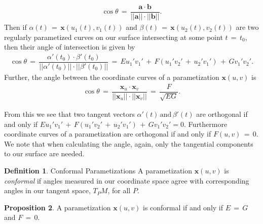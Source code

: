 \documentclass{UKZNcomp}
\newcommand{\vect}[1]{\mathbf{#1}} %
\theoremstyle{definition}
\newtheorem{definition}{Definition}[section]
\newtheorem{prop}[definition]{Proposition}
\theoremstyle{remark}
\begin{document}
\begin{align*}
\cos \theta \,=\,\dfrac{\vect{a}\cdot\vect{b}}{\lvert\lvert\vect{a}\rvert\rvert\cdot\lvert\lvert\vect{b}\rvert\rvert}.
\end{align*}
Then if $\alpha(t)\,=\,\vect{x}(u_1(t),v_1(t))$ and $\beta(t)\,=\,\vect{x}(u_2(t),v_2(t))$  are two regularly parametized curves on our surface intersecting at some point $t\,=\,t_0$, then their angle of intersection is given by
\begin{align*}
\cos \theta \,=\,\dfrac{\alpha'(t_0) \cdot \beta'(t_0)}{\lvert\lvert\alpha'(t_0)\rvert\rvert \cdot \lvert\lvert\beta'(t_0)\rvert\rvert}\,=\,Eu_1'v_1'\,+\,F(u_1'v_2'\,+\,u_2'v_1')\,+\,Gv_1'v_2'.
\end{align*}
Further, the angle between the coordinate curves of a parametization $\vect{x}(u,v)$ is 
\begin{align*}
\cos \theta \, = \, \dfrac{\vect x_u\cdot\vect x_v}{\lvert\lvert\vect x_u\rvert\rvert\cdot\lvert\lvert\vect x_v\rvert\rvert}\,=\,\dfrac{F}{\sqrt{EG}}.
\end{align*}

From this we see that two tangent vectors $\alpha'(t)\,\text{and}\,\beta'(t)$ are orthogonal if and only if $Eu_1'v_1'\,+\,F(u_1'v_2'\,+\,u_2'v_1')\,+\,Gv_1'v_2' = 0$. Furthermore coordinate curves of a parametization are orthogonal if and only if $F(u,v) \,= \,0$. We note that when calculating the angle, again, only the tangential components to our surface are needed.

\begin{definition}{Conformal Parametizations}
A parametization $\vect{x}(u,v)$ is \textit{conformal} if angles measured in our coordinate space agree with corresponding angles in our tangent space, $T_PM$, for all $P$.
\end{definition}

\begin{prop}
A parametization $\vect{x}(u,v)$ is conformal if and only if $E\,=\,G$ and $F\,=\,0$.
\end{prop}
\end{document}
